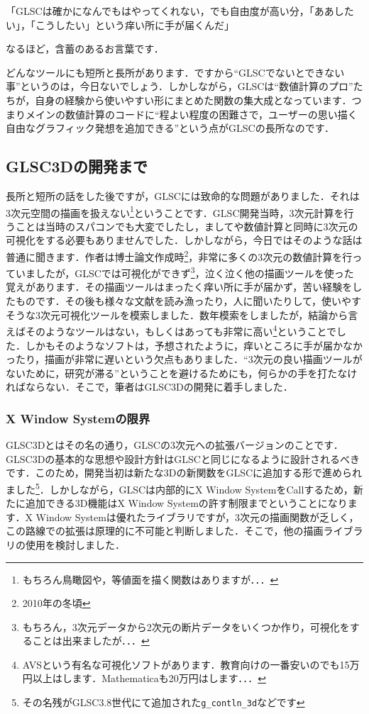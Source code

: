 \documentclass[platex,a4paper,12pt]{jsarticle}%
\begin{document}
\noindent
「GLSCは確かになんでもはやってくれない，でも自由度が高い分，「ああしたい」，「こうしたい」という痒い所に手が届くんだ」

\noindent
なるほど，含蓄のあるお言葉です．

どんなツールにも短所と長所があります．ですから``GLSCでないとできない事''というのは，今日ないでしょう．しかしながら，GLSCは``数値計算のプロ''たちが，自身の経験から使いやすい形にまとめた関数の集大成となっています．つまりメインの数値計算のコードに``程よい程度の困難さで，ユーザーの思い描く自由なグラフィック発想を追加できる''という点がGLSCの長所なのです．
\subsection{GLSC3Dの開発まで}

長所と短所の話をした後ですが，GLSCには致命的な問題がありました．それは3次元空間の描画を扱えない\footnote{もちろん鳥瞰図や，等値面を描く関数はありますが．．．}ということです．GLSC開発当時，3次元計算を行うことは当時のスパコンでも大変でしたし，ましてや数値計算と同時に3次元の可視化をする必要もありませんでした．しかしながら，今日ではそのような話は普通に聞きます．作者は博士論文作成時\footnote{2010年の冬頃}，非常に多くの3次元の数値計算を行っていましたが，GLSCでは可視化ができず\footnote{もちろん，3次元データから2次元の断片データをいくつか作り，可視化をすることは出来ましたが．．．}，泣く泣く他の描画ツールを使った覚えがあります．その描画ツールはまったく痒い所に手が届かず，苦い経験をしたものです．その後も様々な文献を読み漁ったり，人に聞いたりして，使いやすそうな3次元可視化ツールを模索しました．数年模索をしましたが，結論から言えばそのようなツールはない，もしくはあっても非常に高い\footnote{AVSという有名な可視化ソフトがあります．教育向けの一番安いのでも15万円以上はします．Mathematicaも20万円はします．．．}ということでした．しかもそのようなソフトは，予想されたように，痒いところに手が届かなかったり，描画が非常に遅いという欠点もありました．``3次元の良い描画ツールがないために，研究が滞る''ということを避けるためにも，何らかの手を打たなければならない．そこで，筆者はGLSC3Dの開発に着手しました．

\subsubsection{X Window Systemの限界}
GLSC3Dとはその名の通り，GLSCの3次元への拡張バージョンのことです．GLSC3Dの基本的な思想や設計方針はGLSCと同じになるように設計されるべきです．このため，開発当初は新たな3Dの新関数をGLSCに追加する形で進められました\footnote{その名残がGLSC3.8世代にて追加された\verb|g_contln_3d|などです}．しかしながら，GLSCは内部的にX Window SystemをCallするため，新たに追加できる3D機能はX Window Systemの許す制限までということになります．X Window Systemは優れたライブラリですが，3次元の描画関数が乏しく，この路線での拡張は原理的に不可能と判断しました．そこで，他の描画ライブラリの使用を検討しました．
\end{document}
